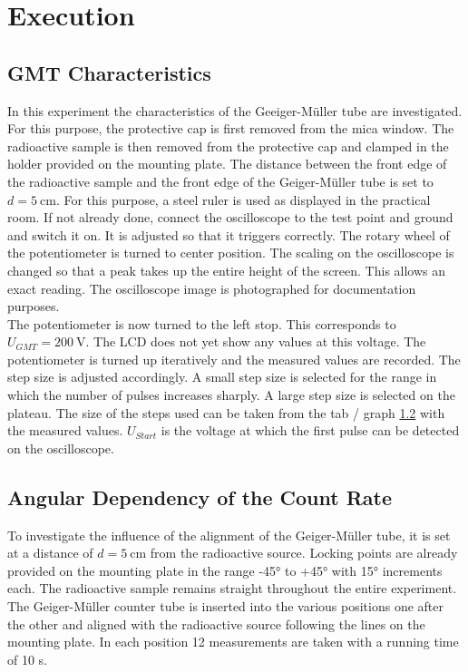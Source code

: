 \chapter{Execution}
\section{GMT Characteristics}
In this experiment the characteristics of the Geeiger-Müller tube are investigated. For this purpose, the protective cap is first removed from the mica window. The radioactive sample is then removed from the protective cap and clamped in the holder provided on the mounting plate. The distance between the front edge of the radioactive sample and the front edge of the Geiger-Müller tube is set to $d = 5\ \mathrm{cm}$. For this purpose, a steel ruler is used as displayed in the practical room. If not already done, connect the oscilloscope to the test point and ground and switch it on. It is adjusted so that it triggers correctly. The rotary wheel of the potentiometer is turned to center position. The scaling on the oscilloscope is changed so that a peak takes up the entire height of the screen. This allows an exact reading. The oscilloscope image is photographed for documentation purposes.\\
The potentiometer is now turned to the left stop. This corresponds to $U_{GMT} = 200\ \mathrm{V}$. The LCD does not yet show any values at this voltage. The potentiometer is turned up iteratively and the measured values are recorded. The step size is adjusted accordingly. A small step size is selected for the range in which the number of pulses increases sharply. A large step size is selected on the plateau. The size of the steps used can be taken from the tab / graph \ref{} with the measured values. $U_{Start}$ is the voltage at which the first pulse can be detected on the oscilloscope.
%
\section{Angular Dependency of the Count Rate}
To investigate the influence of the alignment of the Geiger-Müller tube, it is set at a distance of $d = 5\ \mathrm{cm}$ from the radioactive source. Locking points are already provided on the mounting plate in the range -45° to +45° with 15° increments each. The radioactive sample remains straight throughout the entire experiment. The Geiger-Müller counter tube is inserted into the various positions one after the other and aligned with the radioactive source following the lines on the mounting plate. In each position 12 measurements are taken with a running time of 10 s. 
%
